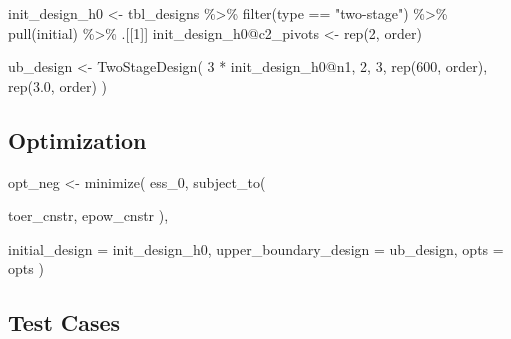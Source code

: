 \documentclass[
]{book}
\newenvironment{Shaded}{\begin{snugshade}}{\end{snugshade}}
\newcommand{\AttributeTok}[1]{\textcolor[rgb]{0.77,0.63,0.00}{#1}}
\newcommand{\DecValTok}[1]{\textcolor[rgb]{0.00,0.00,0.81}{#1}}
\newcommand{\FloatTok}[1]{\textcolor[rgb]{0.00,0.00,0.81}{#1}}
\newcommand{\FunctionTok}[1]{\textcolor[rgb]{0.00,0.00,0.00}{#1}}
\newcommand{\NormalTok}[1]{#1}
\newcommand{\OtherTok}[1]{\textcolor[rgb]{0.56,0.35,0.01}{#1}}
\newcommand{\SpecialCharTok}[1]{\textcolor[rgb]{0.00,0.00,0.00}{#1}}
\newcommand{\StringTok}[1]{\textcolor[rgb]{0.31,0.60,0.02}{#1}}
\begin{document}
\begin{Shaded}
\begin{Highlighting}[]
\NormalTok{init\_design\_h0 }\OtherTok{\textless{}{-}}\NormalTok{ tbl\_designs }\SpecialCharTok{\%\textgreater{}\%} 
    \FunctionTok{filter}\NormalTok{(type }\SpecialCharTok{==} \StringTok{"two{-}stage"}\NormalTok{) }\SpecialCharTok{\%\textgreater{}\%} 
    \FunctionTok{pull}\NormalTok{(initial) }\SpecialCharTok{\%\textgreater{}\%} 
\NormalTok{    .[[}\DecValTok{1}\NormalTok{]]}
\NormalTok{init\_design\_h0}\SpecialCharTok{@}\NormalTok{c2\_pivots }\OtherTok{\textless{}{-}} \FunctionTok{rep}\NormalTok{(}\DecValTok{2}\NormalTok{, order)}

\NormalTok{ub\_design }\OtherTok{\textless{}{-}} \FunctionTok{TwoStageDesign}\NormalTok{(}
    \DecValTok{3} \SpecialCharTok{*}\NormalTok{ init\_design\_h0}\SpecialCharTok{@}\NormalTok{n1,}
    \DecValTok{2}\NormalTok{,}
    \DecValTok{3}\NormalTok{,}
    \FunctionTok{rep}\NormalTok{(}\DecValTok{600}\NormalTok{, order),}
    \FunctionTok{rep}\NormalTok{(}\FloatTok{3.0}\NormalTok{, order)}
\NormalTok{)}
\end{Highlighting}
\end{Shaded}

\hypertarget{optimization-17}{%
\subsection{Optimization}\label{optimization-17}}

\begin{Shaded}
\begin{Highlighting}[]
\NormalTok{opt\_neg }\OtherTok{\textless{}{-}} \FunctionTok{minimize}\NormalTok{(}
\NormalTok{        ess\_0,}
        \FunctionTok{subject\_to}\NormalTok{(}
          
\NormalTok{            toer\_cnstr,}
\NormalTok{            epow\_cnstr}
\NormalTok{        ),}
        
        \AttributeTok{initial\_design =}\NormalTok{ init\_design\_h0,}
        \AttributeTok{upper\_boundary\_design =}\NormalTok{ ub\_design,}
        \AttributeTok{opts =}\NormalTok{ opts}
\NormalTok{)}
\end{Highlighting}
\end{Shaded}

\hypertarget{test-cases-18}{%
\subsection{Test Cases}\label{test-cases-18}}
\end{document}
